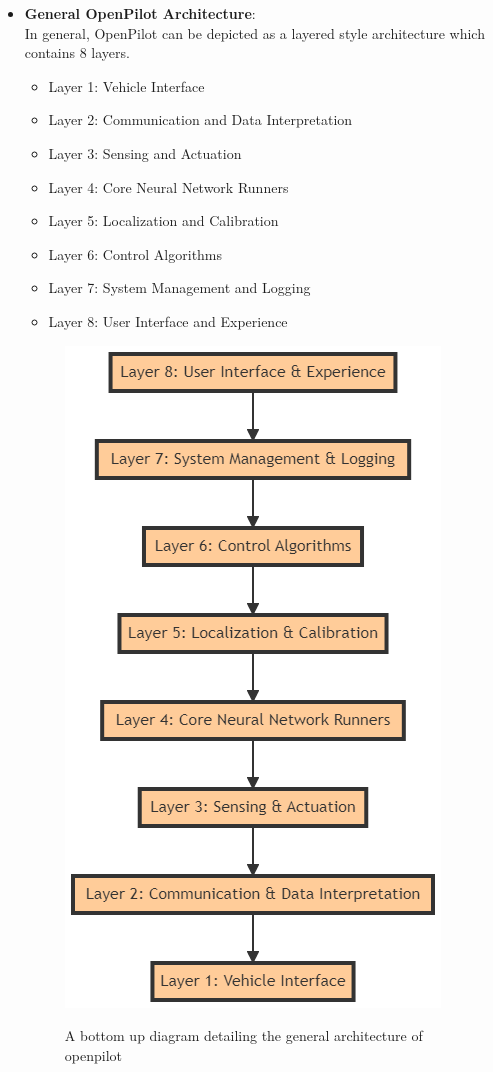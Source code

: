 \documentclass[12pt]{article}
\begin{document}
\begin{itemize}
    \item \textbf{General OpenPilot Architecture}: 
    \\In general, OpenPilot can be depicted as a layered style architecture which contains 8 layers.
    \begin{itemize}
        \item Layer 1: Vehicle Interface 
        \item Layer 2: Communication and Data Interpretation
        \item Layer 3: Sensing and Actuation
        \item Layer 4: Core Neural Network Runners
        \item Layer 5: Localization and Calibration \item Layer 6: Control Algorithms
        \item Layer 7: System Management and Logging
        \item Layer 8: User Interface and Experience 
    \end{itemize} 
    \begin{figure}[ht]
        \centering
        \includegraphics[scale=0.5]{Assets/layers.png}\\
        \caption{A bottom up diagram detailing the general architecture of openpilot}
        \label{fig:enter-label}
    \end{figure}


\end{itemize}
\end{document}
